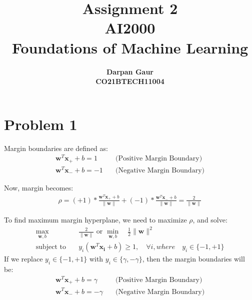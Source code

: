 \documentclass[12pt]{article}
\title{
    \textbf{Assignment 2} \\ 
    \textbf{AI2000} \\
    \textbf{Foundations of Machine Learning}
}
\author{
    \textbf{Darpan Gaur} \\
    \textbf{CO21BTECH11004}
}
\date{}
\begin{document}
\maketitle

\hrulefill

\section*{Problem 1}
Margin boundaries are defined as:
\begin{equation}
    \begin{aligned}
        \mathbf{w}^T \mathbf{x_+} + b = 1 \quad & \text{(Positive Margin Boundary)} \\
        \mathbf{w}^T \mathbf{x_-} + b = -1 \quad & \text{(Negative Margin Boundary)} 
    \end{aligned}
\end{equation}

Now, margin becomes:
\begin{equation}
    \begin{aligned}
        \rho = (+1)* \frac{\mathbf{w}^T \mathbf{x_+} + b}{\|\mathbf{w}\|} + (-1)* \frac{\mathbf{w}^T \mathbf{x_-} + b}{\|\mathbf{w}\|} = \frac{2}{\|\mathbf{w}\|}
    \end{aligned}
\end{equation}

To find maximum margin hyperplane, we need to maximize $\rho$, and solve:
\begin{equation}
    \begin{aligned}
        \max_{\mathbf{w}, b} \quad & \frac{2}{\|\mathbf{w}\|} \text{ or } \min_{\mathbf{w}, b} \quad \frac{1}{2} \|\mathbf{w}\|^2 \\
        \text{subject to} \quad & y_i(\mathbf{w}^T \mathbf{x_i} + b) \geq 1, \quad \forall i, where \quad y_i \in \{-1, +1\}
    \end{aligned}
\end{equation}
If we replace $y_i \in \{-1, +1\}$ with $y_i \in \{\gamma, -\gamma\}$, then the margin boundaries will be:
\begin{equation}
    \begin{aligned}
        \mathbf{w}^T \mathbf{x_+} + b = \gamma \quad & \text{(Positive Margin Boundary)} \\
        \mathbf{w}^T \mathbf{x_-} + b = -\gamma \quad & \text{(Negative Margin Boundary)} 
    \end{aligned}
\end{equation}
\end{document}
